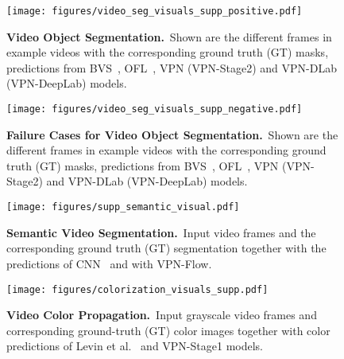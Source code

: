 \documentclass[10pt,twocolumn,letterpaper]{article}
\newcommand{\mycaption}[2]{\caption{\small \textbf{#1.}~#2}}
\begin{document}
\begin{figure}[th!]
\begin{center}
  \centerline{\texttt{[image: figures/video\_seg\_visuals\_supp\_positive.pdf]}}
    \mycaption{Video Object Segmentation}
    {Shown are the different frames in example videos with the corresponding
    ground truth (GT) masks, predictions from BVS~\cite{marki2016bilateral},
    OFL~\cite{tsaivideo}, VPN (VPN-Stage2) and VPN-DLab (VPN-DeepLab) models.}
    \label{fig:video_seg_pos_supp}
\end{center}
\vspace{-1.0cm}
\end{figure}

\begin{figure}[th!]
\begin{center}
  \centerline{\texttt{[image: figures/video\_seg\_visuals\_supp\_negative.pdf]}}
    \mycaption{Failure Cases for Video Object Segmentation}
    {Shown are the different frames in example videos with the corresponding
    ground truth (GT) masks, predictions from BVS~\cite{marki2016bilateral},
    OFL~\cite{tsaivideo}, VPN (VPN-Stage2) and VPN-DLab (VPN-DeepLab) models.}
    \label{fig:video_seg_neg_supp}
\end{center}
\vspace{-1.0cm}
\end{figure}

\begin{figure}[th!]
\begin{center}
  \centerline{\texttt{[image: figures/supp\_semantic\_visual.pdf]}}
    \mycaption{Semantic Video Segmentation}
    {Input video frames and the corresponding ground truth (GT)
    segmentation together with the predictions of CNN~\cite{yu2015multi} and with
    VPN-Flow.}
    \label{fig:semantic_visuals_supp}
\end{center}
\vspace{-0.7cm}
\end{figure}

\begin{figure}[th!]
\begin{center}
  \centerline{\texttt{[image: figures/colorization\_visuals\_supp.pdf]}}
  \mycaption{Video Color Propagation}
  {Input grayscale video frames and corresponding ground-truth (GT) color images
  together with color predictions of Levin et al.~\cite{levin2004colorization} and VPN-Stage1 models.}
  \label{fig:color_visuals_supp}
\end{center}
\vspace{-0.7cm}
\end{figure}
\end{document}
